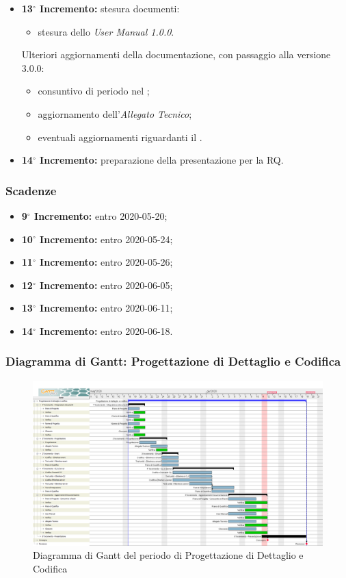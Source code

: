\begin{itemize}
				\item \textbf{13$^{\circ}$ Incremento:} stesura documenti:
				\begin{itemize}
					\item stesura dello \textit{User Manual 1.0.0}.
				\end{itemize}
				Ulteriori aggiornamenti della documentazione, con passaggio alla versione 3.0.0:%
					\begin{itemize}
						\item consuntivo di periodo nel \PdP{};
						\item aggiornamento dell'\textit{Allegato Tecnico};
						\item eventuali aggiornamenti riguardanti il \Glossario{}.
					\end{itemize}
				\item \textbf{14$^{\circ}$ Incremento:} preparazione della presentazione per la RQ.
			\end{itemize}
		\subsubsection{Scadenze}
			\begin{itemize}
				\item \textbf{9$^{\circ}$ Incremento:} entro 2020-05-20;
				\item \textbf{10$^{\circ}$ Incremento:} entro 2020-05-24;
				\item \textbf{11$^{\circ}$ Incremento:} entro 2020-05-26;
				\item \textbf{12$^{\circ}$ Incremento:} entro 2020-06-05;
				\item \textbf{13$^{\circ}$ Incremento:} entro 2020-06-11;
				\item \textbf{14$^{\circ}$ Incremento:} entro 2020-06-18.
			\end{itemize}
	\subsubsection{Diagramma di Gantt: Progettazione di Dettaglio e Codifica}
		\begin{figure}[h]
			\centering
			\includegraphics[width=1.1\textwidth]{./res/img/DiagrammiGantt/prog_dett_gantt.png}
			\caption{Diagramma di Gantt del periodo di Progettazione di Dettaglio e Codifica}
		\end{figure}
\newpage
